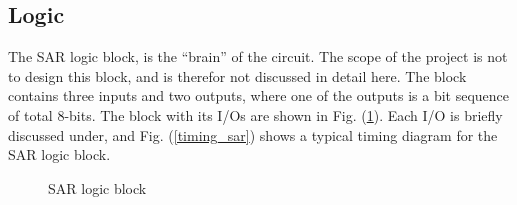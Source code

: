 \documentclass[english, 12pt, a4paper]{ifimaster}
\begin{document}
\subsection{Logic}
The SAR logic block, is the ``brain'' of the circuit. The scope of the project is not to design this block, and is therefor not discussed in detail here. The block contains three inputs and 
two outputs, where one of the outputs is a bit sequence of total 8-bits. The block with its I/Os are shown in Fig. (\ref{sar:logic}). Each I/O is briefly discussed under, and Fig. (\ref{timing_sar})
shows a typical timing diagram for the SAR logic block.
\begin{figure}[!ht]
 \centering
 \caption{SAR logic block}
 \label{sar:logic}
\end{figure}
\end{document}
